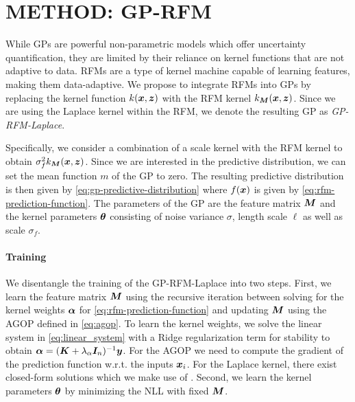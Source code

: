 \section{METHOD: GP-RFM}
While GPs are powerful non-parametric models which offer uncertainty quantification, they are limited by their reliance on kernel functions that are not adaptive to data. RFMs are a type of kernel machine capable of learning features, making them data-adaptive.
We propose to integrate RFMs into GPs by replacing the kernel function $k({\bm{x}},{\bm{z}})$ with the RFM kernel $k_{\bm{M}}({\bm{x}},{\bm{z}})$.
Since we are using the Laplace kernel within the RFM, we denote the resulting GP as \emph{GP-RFM-Laplace}.

Specifically, we consider a combination of a scale kernel with the RFM kernel to obtain $\sigma_f^2 k_{\bm{M}}({\bm{x}},{\bm{z}})$.
Since we are interested in the predictive distribution, we can set the mean function $m$ of the GP to zero. The resulting predictive distribution is then given by \cref{eq:gp-predictive-distribution} where $f({\bm{x}})$ is given by \cref{eq:rfm-prediction-function}.
The parameters of the GP are the feature matrix ${\bm{M}}$ and the kernel parameters ${\bm{\theta}}$ consisting of noise variance $\sigma$, length scale $\ell$ as well as scale $\sigma_f$.

\paragraph{Training}
We disentangle the training of the GP-RFM-Laplace into two steps.
First, we learn the feature matrix ${\bm{M}}$ using the recursive iteration between solving for the kernel weights $\bm{\alpha}$ for \cref{eq:rfm-prediction-function} and updating ${\bm{M}}$ using the AGOP defined in \cref{eq:agop}.
To learn the kernel weights, we solve the linear system in \cref{eq:linear_system} with a Ridge regularization term for stability to obtain $\bm{\alpha} = ({\bm{K}}+\lambda_\alpha{\bm{I}}_n)^{-1}{\bm{y}}$.
For the AGOP we need to compute the gradient of the prediction function w.r.t. the inputs ${\bm{x}}_i$. For the Laplace kernel, there exist closed-form solutions which we make use of \citep{radhakrishnan2022feature}.
Second, we learn the kernel parameters ${\bm{\theta}}$ by minimizing the NLL with fixed ${\bm{M}}$.

